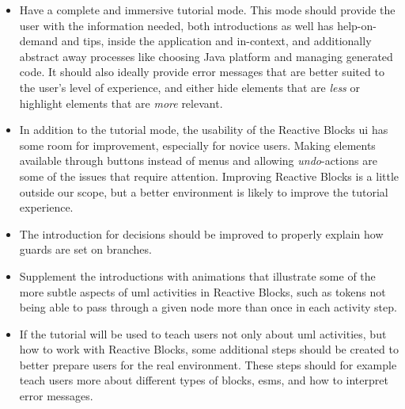 \begin{itemize}
	\item Have a complete and immersive tutorial mode. This mode should provide the user with the information needed, both introductions as well has help-on-demand and tips, inside the application and in-context, and additionally abstract away processes like choosing Java platform and managing generated code. It should also ideally provide error messages that are better suited to the user's level of experience, and either hide elements that are \emph{less} or highlight elements that are \emph{more} relevant.
	\item In addition to the tutorial mode, the usability of the Reactive Blocks \gls{ui} has some room for improvement, especially for novice users. Making elements available through buttons instead of menus and allowing \emph{undo}-actions are some of the issues that require attention. Improving Reactive Blocks is a little outside our scope, but a better environment is likely to improve the tutorial experience.
	\item The introduction for decisions should be improved to properly explain how guards are set on branches.
	\item Supplement the introductions with animations that illustrate some of the more subtle aspects of \gls{uml} activities in Reactive Blocks, such as tokens not being able to pass through a given node more than once in each activity step.
	\item If the tutorial will be used to teach users not only about \gls{uml} activities, but how to work with Reactive Blocks, some additional steps should be created to better prepare users for the real environment. These steps should for example teach users more about different types of blocks, \glspl{esm}, and how to interpret error messages.
\end{itemize}


